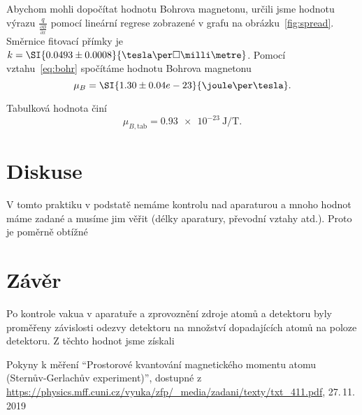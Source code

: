 \documentclass{scirep}
\begin{document}

    Abychom mohli dopočítat hodnotu Bohrova magnetonu, určili jsme hodnotu výrazu $\frac{q}{\frac{\partial B}{\partial x}}$ pomocí lineární regrese zobrazené v grafu na obrázku~\ref{fig:spread}.
    Směrnice fitovací přímky je $ k = \SI{0.0493 \pm 0.0008}{\tesla\per\square\milli\metre} $.
    Pomocí vztahu~\eqref{eq:bohr} spočítáme hodnotu Bohrova magnetonu
    \[ \mu_B = \SI{1.30 \pm 0.04 e-23}{\joule\per\tesla}. \]

    Tabulková hodnota činí \[ \mu_{B, \text{tab}} = \SI{0.93 e-23}{\joule\per\tesla}. \]

    \section*{Diskuse}

    V tomto praktiku v podstatě nemáme kontrolu nad aparaturou a mnoho hodnot máme zadané a musíme jim věřit (délky aparatury, převodní vztahy atd.).
    Proto je poměrně obtížné

    \section*{Závěr}

    Po kontrole vakua v aparatuře a zprovoznění zdroje atomů a detektoru byly proměřeny závislosti odezvy detektoru na množství dopadajících atomů na poloze detektoru.
    Z těchto hodnot jsme získali

    \begin{thebibliography}{}

        Pokyny k měření ``Prostorové kvantování magnetického momentu atomu (Sternův-Gerlachův experiment)'', dostupné z\\ \url{https://physics.mff.cuni.cz/vyuka/zfp/_media/zadani/texty/txt_411.pdf}, 27.\,11.\,2019

    \end{thebibliography}
\end{document}
